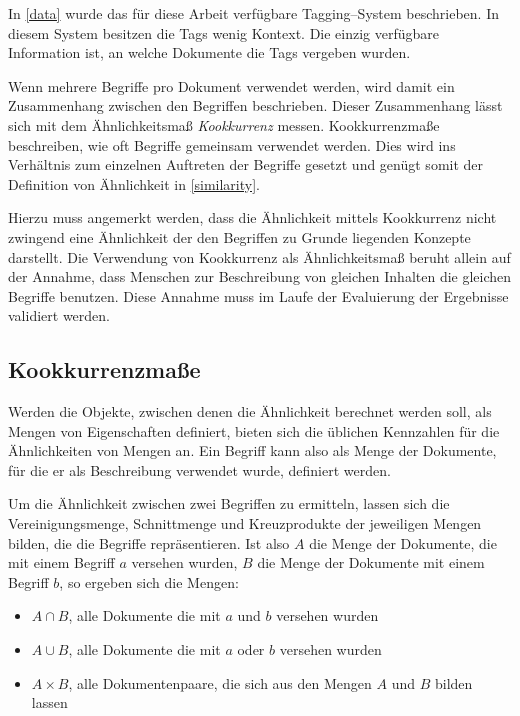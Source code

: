 In \cref{data} wurde das für diese Arbeit verfügbare Tagging--System beschrieben. In diesem System besitzen die Tags wenig Kontext. Die einzig verfügbare Information ist, an welche Dokumente die Tags vergeben wurden.

Wenn mehrere Begriffe pro Dokument verwendet werden, wird damit ein Zusammenhang zwischen den Begriffen beschrieben. Dieser Zusammenhang lässt sich mit dem Ähnlichkeitsmaß \emph{Kookkurrenz} messen. Kookkurrenzmaße beschreiben, wie oft Begriffe gemeinsam verwendet werden. Dies wird ins Verhältnis zum einzelnen Auftreten der Begriffe gesetzt und genügt somit der Definition von Ähnlichkeit in \cref{similarity}.

Hierzu muss angemerkt werden, dass die Ähnlichkeit mittels Kookkurrenz nicht zwingend eine Ähnlichkeit der den Begriffen zu Grunde liegenden Konzepte darstellt. Die Verwendung von Kookkurrenz als Ähnlichkeitsmaß beruht allein auf der Annahme, dass Menschen zur Beschreibung von gleichen Inhalten die gleichen Begriffe benutzen. Diese Annahme muss im Laufe der Evaluierung der Ergebnisse validiert werden.

\subsection{Kookkurrenzmaße}
\label{measures}

Werden die Objekte, zwischen denen die Ähnlichkeit berechnet werden soll, als Mengen von Eigenschaften definiert, bieten sich die üblichen Kennzahlen für die Ähnlichkeiten von Mengen an. Ein Begriff kann also als Menge der Dokumente, für die er als Beschreibung verwendet wurde, definiert werden.

Um die Ähnlichkeit zwischen zwei Begriffen zu ermitteln, lassen sich die Vereinigungsmenge, Schnittmenge und Kreuzprodukte der jeweiligen Mengen bilden, die die Begriffe repräsentieren. Ist also \(A\) die Menge der Dokumente, die mit einem Begriff \(a\) versehen wurden, \(B\) die Menge der Dokumente mit einem Begriff \(b\), so ergeben sich die Mengen:

\begin{itemize}
    \item \(A \cap B\), alle Dokumente die mit \(a\) und \(b\) versehen wurden
    \item \(A \cup B\), alle Dokumente die mit \(a\) oder \(b\) versehen wurden
    \item \(A \times B\), alle Dokumentenpaare, die sich aus den Mengen \(A\) und \(B\) bilden lassen
\end{itemize}

